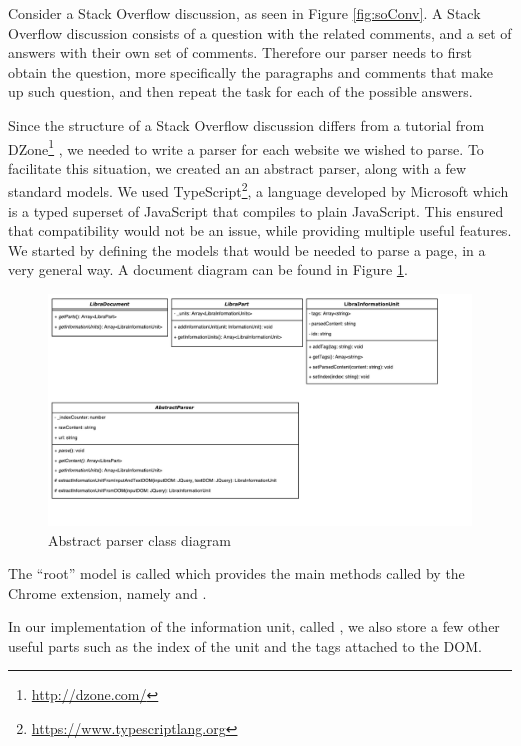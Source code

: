 Consider a Stack Overflow discussion, as seen in Figure \ref{fig:soConv}. A Stack Overflow discussion consists of a question with the related comments, and a set of answers with their own set of comments. Therefore our parser needs to first obtain the question, more specifically the paragraphs and comments that make up such question, and then repeat the task for each of the possible answers. 

Since the structure of a Stack Overflow discussion differs from a tutorial from DZone\footnote{\url{http://dzone.com/}} , we needed to write a parser for each website we wished to parse. To facilitate this situation, we created an an abstract parser, along with a few standard models. We used TypeScript\footnote{\url{https://www.typescriptlang.org}}, a language developed by Microsoft which is a typed superset of JavaScript that compiles to plain JavaScript. This ensured that compatibility would not be an issue, while providing multiple useful features. We started by defining the models that would be needed to parse a page, in a very general way. A document diagram can be found in Figure \ref{fig:abstractParserClassDiagram}.

\begin{figure}[H]
\centering
\includegraphics[scale=0.5]{Figures/ClassUML}
\caption{Abstract parser class diagram}
\label{fig:abstractParserClassDiagram}
\end{figure}

The ``root'' model is called  which provides the main methods called by the Chrome extension, namely  and . 

In our implementation of the information unit, called , we also store a few other useful parts such as the index of the unit and the tags attached to the DOM. 

